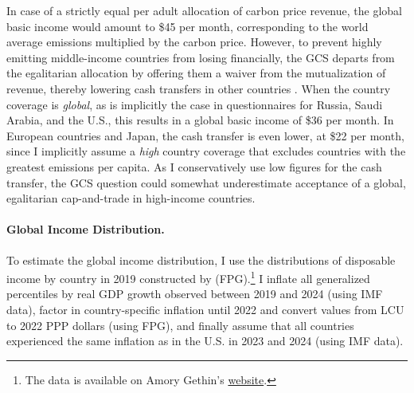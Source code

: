 In case of a strictly equal per adult allocation of carbon price revenue, the global basic income would amount to \$45 per month, corresponding to the world average emissions multiplied by the carbon price. However, to prevent highly emitting middle-income countries from losing financially, the GCS departs from the egalitarian allocation by offering them a waiver from the mutualization of revenue, thereby lowering cash transfers in other countries \citep{fabre_plan_2024}. 
When the country coverage is \textit{global}, as is implicitly the case in questionnaires for Russia, Saudi Arabia, and the U.S., this results in a global basic income of \$36 per month. 
In European countries and Japan, the cash transfer is even lower, at \$22 per month, since I implicitly assume a \textit{high} country coverage %
that excludes countries with the greatest emissions per capita. 
As I conservatively use low figures for the cash transfer, the GCS question could somewhat underestimate acceptance of a global, egalitarian cap-and-trade in high-income countries. 


\paragraph{Global Income Distribution.}

To estimate the global income distribution, I use the distributions of disposable income by country in 2019 constructed by \cite{fisher-post_government_2023} (FPG).\footnote{The data is available on Amory Gethin's \href{https://www.dropbox.com/scl/fi/rd1d7rke0wwwr6948ea67/fisher-gethin-redistribution-2025-01-10.dta}{website}.} I inflate all generalized percentiles by real GDP growth observed between 2019 and 2024 (using IMF data), factor in country-specific inflation until 2022 and convert values from LCU to 2022 PPP dollars (using FPG), and finally assume that all countries experienced the same inflation as in the U.S. in 2023 and 2024 (using IMF data). 

